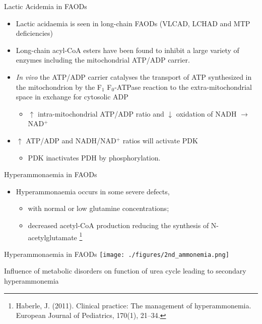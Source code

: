 \documentclass[presentation, smaller]{beamer}
\begin{document}
\begin{frame}[label={sec:orgheadline15}]{Lactic Acidemia in FAODs}
\begin{itemize}
\item Lactic acidaemia is seen in long-chain FAODs (VLCAD, LCHAD and MTP deficiencies)
\item Long-chain acyl-CoA esters have been found to inhibit a large
variety of enzymes including the mitochondrial ATP/ADP carrier.

\item \emph{In vivo} the ATP/ADP carrier catalyses the transport of ATP
synthesized in the mitochondrion by the F\(_{\text{1}}\) F\(_{\text{0}}\)-ATPase reaction to the
extra-mitochondrial space in exchange for cytosolic ADP
\begin{itemize}
\item \(\uparrow\) intra-mitochondrial ATP/ADP ratio and \(\downarrow\) oxidation of
NADH \(\to\) NAD\(^{\text{+}}\)
\end{itemize}
\item \(\uparrow\) ATP/ADP and NADH/NAD\(^{\text{+}}\) ratios will activate PDK
\begin{itemize}
\item PDK inactivates PDH by phosphorylation.
\end{itemize}
\end{itemize}
\end{frame}

\begin{frame}[label={sec:orgheadline16}]{Hyperammonaemia in FAODs}
\begin{itemize}
\item Hyperammonaemia occurs in some severe defects,
\begin{itemize}
\item with normal or low glutamine concentrations;
\item decreased acetyl-CoA production reducing the synthesis of N-acetylglutamate \footnote{Haberle, J. (2011). Clinical practice: The management of
hyperammonemia. European Journal of Pediatrics, 170(1), 21–34.}
\end{itemize}
\end{itemize}
\end{frame}

\begin{frame}[label={sec:orgheadline17}]{Hyperammonaemia in FAODs}
\texttt{[image: ./figures/2nd\_ammonemia.png]}

\tiny
Influence of metabolic disorders on function of urea cycle leading to secondary hyperammonemia
\end{frame}
\end{document}
